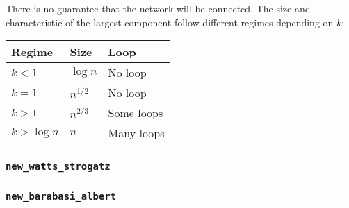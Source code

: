 There is no guarantee that the network will be connected. The size and 
characteristic of the largest component follow different regimes 
depending on $k$:

\begin{table*}[!hb]
 \centering
 \begin{tabular}{lll}
  \hline
  Regime       & Size      & Loop \\ \hline
  $k < 1$      & $\log n$  & No loop\\
  $k = 1$      & $n^{1/2}$ & No loop\\
  $k > 1$      & $n^{2/3}$ & Some loops\\
  $k > \log n$ & $n$       & Many loops \\\hline
 \end{tabular}
\end{table*}

\subsubsection{\texttt{new\_watts\_strogatz}}
\subsubsection{\texttt{new\_barabasi\_albert}}
